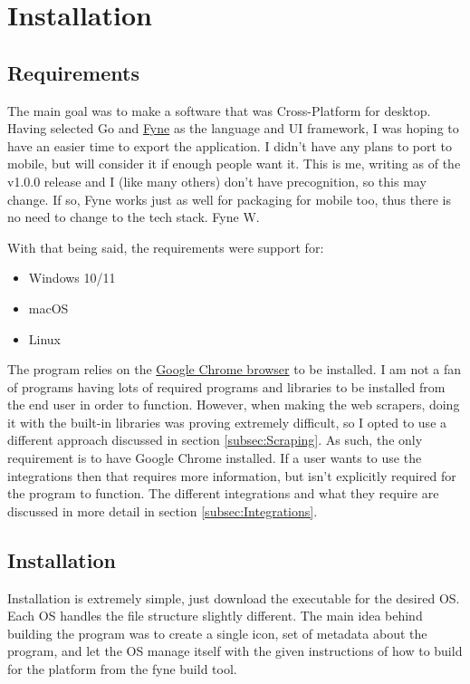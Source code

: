 \section{Installation}

\subsection{Requirements}

The main goal was to make a software that was Cross-Platform for desktop.
Having selected Go and \href{https://fyne.io/}{Fyne} as the language and UI
framework, I was hoping to have an easier time to export the application.
I didn't have any plans to port to mobile, but will consider it if
enough people want it. This is me, writing as of the v1.0.0 release
and I (like many others) don't have precognition, so this may change.
If so, Fyne works just as well for packaging for mobile too, thus there
is no need to change to the tech stack. Fyne W.

With that being said, the requirements were support for:
\begin{itemize}
	\item Windows 10/11
	\item macOS
	\item Linux
\end{itemize}

The program relies on the
\href{https://www.google.com/chrome/}{Google Chrome browser} to be installed.
I am not a fan of programs having lots of required programs and
libraries to be installed from the end user in order to function.
However, when making the web scrapers, doing it with the built-in
libraries was proving extremely difficult, so I opted to use a
different approach discussed in section \ref{subsec:Scraping}.
As such, the only requirement is to have Google Chrome installed.
If a user wants to use the integrations then that requires more
information, but isn't explicitly required for the program to function.
The different integrations and what they require are discussed in
more detail in section \ref{subsec:Integrations}.

\subsection{Installation}
\label{subsec:Installation}

Installation is extremely simple, just download the executable for
the desired OS.
Each OS handles the file structure slightly different.
The main idea behind building the program was to create a single
icon, set of metadata about
the program, and let the OS manage itself with the given instructions
of how to build for the platform from the fyne build tool.

